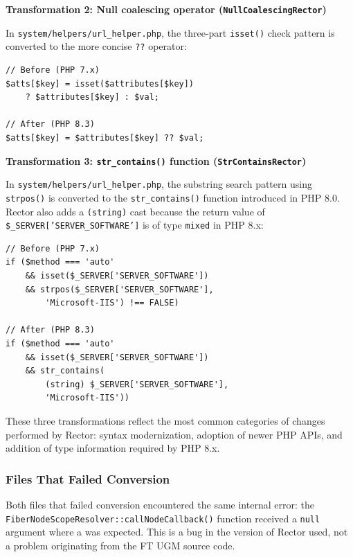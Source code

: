 \noindent\begin{minipage}{\linewidth}
\textbf{Transformation 2: Null coalescing operator (\texttt{NullCoalescingRector})}

In \texttt{system/helpers/url\_helper.php}, the three-part \texttt{isset()} check pattern is converted to the more concise \texttt{??} operator:

\begin{lstlisting}[style=promptstyle]
// Before (PHP 7.x)
$atts[$key] = isset($attributes[$key])
    ? $attributes[$key] : $val;

// After (PHP 8.3)
$atts[$key] = $attributes[$key] ?? $val;
\end{lstlisting}
\end{minipage}

\noindent\begin{minipage}{\linewidth}
\textbf{Transformation 3: \texttt{str\_contains()} function (\texttt{StrContainsRector})}

In \texttt{system/helpers/url\_helper.php}, the substring search pattern using \texttt{strpos()} is converted to the \texttt{str\_contains()} function introduced in PHP 8.0. Rector also adds a \texttt{(string)} cast because the return value of \texttt{\$\_SERVER['SERVER\_SOFTWARE']} is of type \texttt{mixed} in PHP 8.x:

\begin{lstlisting}[style=promptstyle]
// Before (PHP 7.x)
if ($method === 'auto'
    && isset($_SERVER['SERVER_SOFTWARE'])
    && strpos($_SERVER['SERVER_SOFTWARE'],
        'Microsoft-IIS') !== FALSE)

// After (PHP 8.3)
if ($method === 'auto'
    && isset($_SERVER['SERVER_SOFTWARE'])
    && str_contains(
        (string) $_SERVER['SERVER_SOFTWARE'],
        'Microsoft-IIS'))
\end{lstlisting}
\end{minipage}

These three transformations reflect the most common categories of changes performed by Rector: syntax modernization, adoption of newer PHP APIs, and addition of type information required by PHP 8.x.

\subsubsection{Files That Failed Conversion}

Both files that failed conversion encountered the same internal error: the \texttt{FiberNodeScopeResolver::callNodeCallback()} function received a \texttt{null} argument where a \texttt{} was expected. This is a bug in the version of Rector used, not a problem originating from the FT UGM source code.


